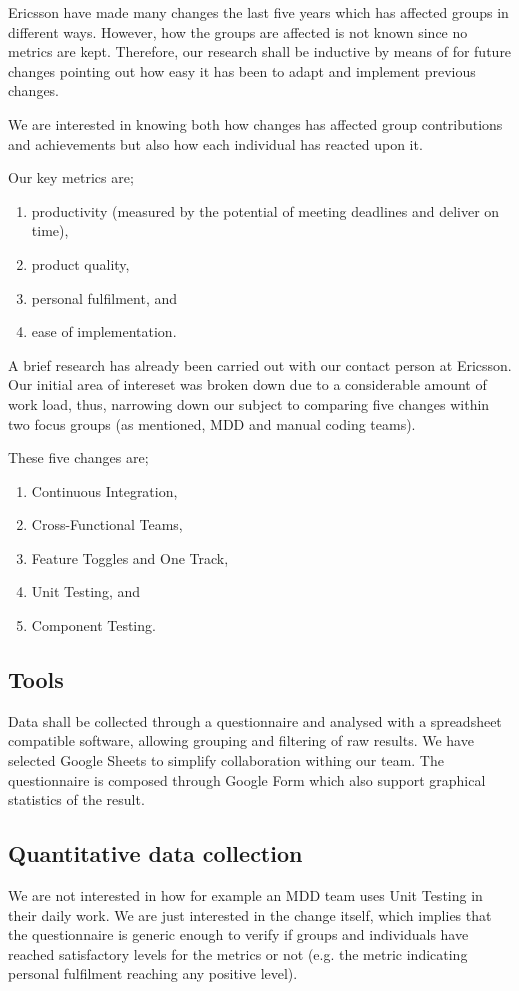 \documentclass[ProjectPlan_innit.tex]{subfiles}
\begin{document}
Ericsson have made many changes the last five years which has affected groups in different ways. However, how the groups are affected is not known since no metrics are kept. Therefore, our research shall be inductive by means of for future changes pointing out how easy it has been to adapt and implement previous changes.

\smallskip
We are interested in knowing both how changes has affected group contributions and achievements but also how each individual has reacted upon it.

\smallskip
Our key metrics are;
\begin{enumerate}
	\item productivity (measured by the potential of meeting deadlines and deliver on time),
	\item product quality,
	\item personal fulfilment, and
	\item ease of implementation.
\end{enumerate}

\smallskip
A brief research has already been carried out with our contact person at Ericsson. Our initial area of intereset was broken down due to a considerable amount of work load, thus, narrowing down our subject to comparing five changes within two focus groups (as mentioned, MDD and manual coding teams).

\smallskip
These five changes are;
\begin{enumerate}
	\item Continuous Integration,
	\item Cross-Functional Teams,
	\item Feature Toggles and One Track,
	\item Unit Testing, and
	\item Component Testing.
\end{enumerate}

\subsection{Tools}
Data shall be collected through a questionnaire and analysed with a spreadsheet compatible software, allowing grouping and filtering of raw results. We have selected Google Sheets to simplify collaboration withing our team. The questionnaire is composed through Google Form which also support graphical statistics of the result.

\subsection{Quantitative data collection}
We are not interested in how for example an MDD team uses Unit Testing in their daily work. We are just interested in the change itself, which implies that the questionnaire is generic enough to verify if groups and individuals have reached satisfactory levels for the metrics or not (e.g. the metric indicating personal fulfilment reaching any positive level). 
\end{document}
